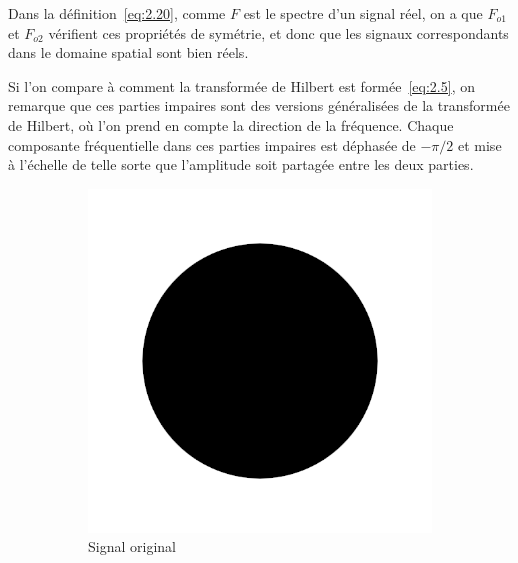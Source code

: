 Dans la définition~\ref{eq:2.20}, comme $F$ est le spectre d'un signal réel, on a que $F_{o1}$ et $F_{o2}$ vérifient ces propriétés de symétrie, et donc que les signaux correspondants dans le domaine spatial sont bien réels.

Si l'on compare à comment la transformée de Hilbert est formée~\ref{eq:2.5}, on remarque que ces parties impaires sont des versions généralisées de la transformée de Hilbert, où l'on prend en compte la direction de la fréquence. Chaque composante fréquentielle dans ces parties impaires est déphasée de $-\pi/2$ et mise à l'échelle de telle sorte que l'amplitude soit partagée entre les deux parties.

\begin{figure}
    \centering
    \begin{subfigure}[b]{.3\textwidth}
        \includegraphics[width=\textwidth]{contenu/resources/images/disk}
        \caption{Signal original}
    \end{subfigure}
    \hfill
    \begin{subfigure}[b]{.3\textwidth}

\end{subfigure}
\end{figure}
